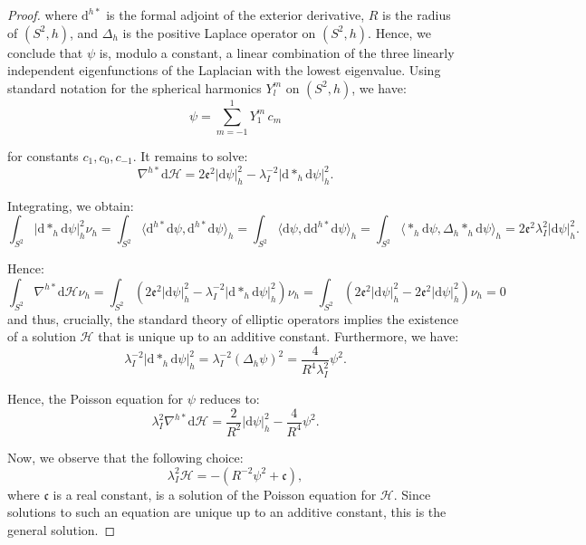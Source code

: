 \documentclass[10pt,a4paper,twoside,reqno]{amsart}
\theoremstyle{plain}
\theoremstyle{definition}
\theoremstyle{remark}
\def\dd{\mathrm{d}}
\def\cH{\mathcal{H}}
\def\cH{\mathcal{H}}
\def\dd{\mathrm{d}}
\def\frc{\mathfrak{F}}
\def\frc{\mathfrak{c}}
\begin{document}
\begin{proof}
\noindent
where $\dd^{h\ast}$ is the formal adjoint of the exterior derivative, $R$ is the radius of $(S^2,h)$, and $\Delta_h$ is the positive Laplace operator on $(S^2,h)$. Hence, we conclude that $\psi$ is, modulo a constant, a linear combination of the three linearly independent eigenfunctions of the Laplacian with the lowest eigenvalue. Using standard notation for the spherical harmonics $Y^m_l$ on $(S^2,h)$, we have: 
\begin{equation*}
\psi = \sum_{m =-1}^1 Y_1^m\, c_m
\end{equation*}

\noindent
for constants $c_1 , c_0, c_{-1}$. It remains to solve:
\begin{equation*}
\nabla^{h\ast}\dd \cH     =   2 \mathfrak{e}^2 \vert \dd \psi\vert^2_h   - \lambda_I^{-2}\vert \dd\ast_h \dd\psi \vert^2_{h}.
\end{equation*}

\noindent
Integrating, we obtain:
\begin{equation*}
\int_{S^2} \vert \dd\ast_h \dd\psi \vert^2_{h} \nu_h = \int_{S^2} \langle  \dd^{h\ast}\dd\psi , \dd^{h\ast}\dd\psi \rangle_{h} = \int_{S^2} \langle   \dd\psi , \dd \dd^{h\ast}\dd\psi \rangle_{h}= \int_{S^2} \langle  \ast_h  \dd\psi , \Delta_h \ast_h\dd\psi \rangle_{h} = 2 \mathfrak{e}^2 \lambda_I^2  \vert \dd \psi\vert_h^2.
\end{equation*}

\noindent
Hence:
\begin{equation*}
\int_{S^2} \nabla^{h\ast}\dd \cH  \nu_h   =  \int_{S^2}    (2 \mathfrak{e}^2 \vert \dd \psi\vert^2_h   - \lambda_I^{-2}\vert \dd\ast_h \dd\psi \vert^2_{h}) \nu_h  =  \int_{S^2}   (2\mathfrak{e}^2 \vert \dd \psi\vert^2_h   - 2 \mathfrak{e}^2   \vert \dd \psi\vert_h^2 ) \nu_h = 0
\end{equation*}
and thus, crucially, the standard theory of elliptic operators implies the existence of a solution $\cH$ that is unique up to an additive constant. Furthermore, we have:
\begin{equation*}
\lambda_I^{-2}\vert \dd\ast_h \dd\psi \vert^2_{h} = \lambda_I^{-2} (\Delta_h \psi)^2 = \frac{4}{R^4 \lambda^2_I} \psi^2.
\end{equation*}

\noindent
Hence, the Poisson equation for $\psi$ reduces to:
\begin{equation*}
\lambda^2_I \nabla^{h\ast}\dd \cH     =   \frac{2}{R^2} \vert \dd \psi\vert^2_h   - \frac{4}{R^4}\psi^2.
\end{equation*}

\noindent
Now, we observe that the following choice:
\begin{equation*}
\lambda_I^2\cH=-(R^{-2}\psi^2+\frc),
\end{equation*}
where $\frc$ is a real constant, is a solution of the Poisson equation for $\cH$. Since solutions to such an equation are unique up to an additive constant, this is the general solution.
\end{proof}
\end{document}
